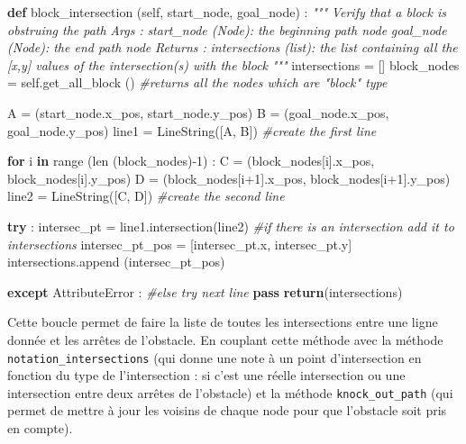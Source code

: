 \documentclass[
]{article}
\newenvironment{Shaded}{}{}
\newcommand{\BuiltInTok}[1]{#1}
\newcommand{\CommentTok}[1]{\textcolor[rgb]{0.38,0.63,0.69}{\textit{#1}}}
\newcommand{\ControlFlowTok}[1]{\textcolor[rgb]{0.00,0.44,0.13}{\textbf{#1}}}
\newcommand{\DecValTok}[1]{\textcolor[rgb]{0.25,0.63,0.44}{#1}}
\newcommand{\KeywordTok}[1]{\textcolor[rgb]{0.00,0.44,0.13}{\textbf{#1}}}
\newcommand{\NormalTok}[1]{#1}
\newcommand{\OperatorTok}[1]{\textcolor[rgb]{0.40,0.40,0.40}{#1}}
\newcommand{\PreprocessorTok}[1]{\textcolor[rgb]{0.74,0.48,0.00}{#1}}
\newcommand{\VariableTok}[1]{\textcolor[rgb]{0.10,0.09,0.49}{#1}}
\begin{document}
\begin{Shaded}
\begin{Highlighting}[]
\KeywordTok{def}\NormalTok{ block\_intersection (}\VariableTok{self}\NormalTok{, start\_node, goal\_node) :}
  \CommentTok{"""}
\CommentTok{  Verify that a block is obstruing the path}
\CommentTok{    Args : }
\CommentTok{        start\_node (Node): the beginning path node}
\CommentTok{        goal\_node (Node): the end path node}
\CommentTok{    Returns : }
\CommentTok{        intersections (list): the list containing all the [x,y] values of the intersection(s) with the block}
\CommentTok{  """}
\NormalTok{  intersections }\OperatorTok{=}\NormalTok{ []}
\NormalTok{  block\_nodes }\OperatorTok{=} \VariableTok{self}\NormalTok{.get\_all\_block () }\CommentTok{\#returns all the nodes which are "block" type}
  
\NormalTok{  A }\OperatorTok{=}\NormalTok{ (start\_node.x\_pos, start\_node.y\_pos)}
\NormalTok{  B }\OperatorTok{=}\NormalTok{ (goal\_node.x\_pos, goal\_node.y\_pos)}
\NormalTok{  line1 }\OperatorTok{=}\NormalTok{ LineString([A, B]) }\CommentTok{\#create the first line}
  
  \ControlFlowTok{for}\NormalTok{ i }\KeywordTok{in} \BuiltInTok{range}\NormalTok{ (}\BuiltInTok{len}\NormalTok{ (block\_nodes)}\OperatorTok{{-}}\DecValTok{1}\NormalTok{) :}
\NormalTok{    C }\OperatorTok{=}\NormalTok{ (block\_nodes[i].x\_pos, block\_nodes[i].y\_pos)}
\NormalTok{    D }\OperatorTok{=}\NormalTok{ (block\_nodes[i}\OperatorTok{+}\DecValTok{1}\NormalTok{].x\_pos, block\_nodes[i}\OperatorTok{+}\DecValTok{1}\NormalTok{].y\_pos)}
\NormalTok{    line2 }\OperatorTok{=}\NormalTok{ LineString([C, D]) }\CommentTok{\#create the second line}

    \ControlFlowTok{try}\NormalTok{ :}
\NormalTok{      intersec\_pt }\OperatorTok{=}\NormalTok{ line1.intersection(line2) }\CommentTok{\#if there is an intersection add it to intersections}
\NormalTok{      intersec\_pt\_pos }\OperatorTok{=}\NormalTok{ [intersec\_pt.x, intersec\_pt.y]}
\NormalTok{      intersections.append (intersec\_pt\_pos) }
                            
    \ControlFlowTok{except} \PreprocessorTok{AttributeError}\NormalTok{ : }\CommentTok{\#else  try next line}
      \ControlFlowTok{pass}
  \ControlFlowTok{return}\NormalTok{(intersections)}
\end{Highlighting}
\end{Shaded}

Cette boucle permet de faire la liste de toutes les intersections entre
une ligne donnée et les arrêtes de l'obstacle. En couplant cette méthode
avec la méthode \texttt{notation\_intersections} (qui donne une note à
un point d'intersection en fonction du type de l'intersection : si c'est
une réelle intersection ou une intersection entre deux arrêtes de
l'obstacle) et la méthode \texttt{knock\_out\_path} (qui permet de
mettre à jour les voisins de chaque node pour que l'obstacle soit pris
en compte).
\end{document}
